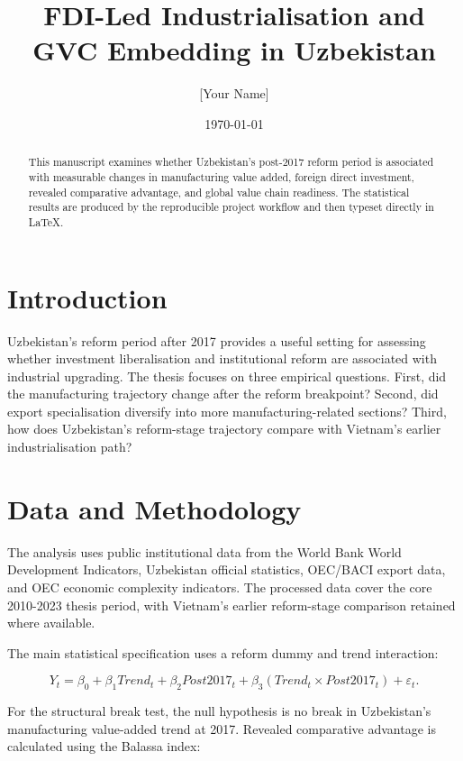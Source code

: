 \documentclass[12pt]{article}
\title{FDI-Led Industrialisation and GVC Embedding in Uzbekistan}
\author{[Your Name]}
\date{\today}
\begin{document}
\maketitle

\begin{abstract}
This manuscript examines whether Uzbekistan's post-2017 reform period is associated with measurable changes in manufacturing value added, foreign direct investment, revealed comparative advantage, and global value chain readiness. The statistical results are produced by the reproducible project workflow and then typeset directly in LaTeX.
\end{abstract}

\tableofcontents
\newpage

\section{Introduction}

Uzbekistan's reform period after 2017 provides a useful setting for assessing whether investment liberalisation and institutional reform are associated with industrial upgrading. The thesis focuses on three empirical questions. First, did the manufacturing trajectory change after the reform breakpoint? Second, did export specialisation diversify into more manufacturing-related sections? Third, how does Uzbekistan's reform-stage trajectory compare with Vietnam's earlier industrialisation path?

\section{Data and Methodology}

The analysis uses public institutional data from the World Bank World Development Indicators, Uzbekistan official statistics, OEC/BACI export data, and OEC economic complexity indicators. The processed data cover the core 2010-2023 thesis period, with Vietnam's earlier reform-stage comparison retained where available.

The main statistical specification uses a reform dummy and trend interaction:

\begin{equation}
Y_t = \beta_0 + \beta_1 Trend_t + \beta_2 Post2017_t + \beta_3(Trend_t \times Post2017_t) + \varepsilon_t.
\end{equation}

For the structural break test, the null hypothesis is no break in Uzbekistan's manufacturing value-added trend at 2017. Revealed comparative advantage is calculated using the Balassa index:
\end{document}
